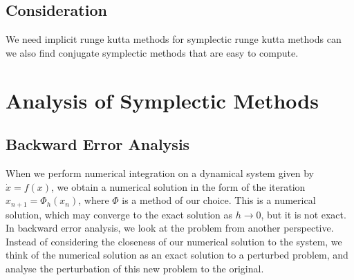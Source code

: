 \subsection{Consideration}

We need implicit runge kutta methods for symplectic runge kutta methods
can we also find conjugate symplectic methods that are easy to compute.


\section{Analysis of Symplectic Methods}

\subsection{Backward Error Analysis}

When we perform numerical integration on a dynamical system given by $\dot{x} = f(x)$,
we obtain a numerical solution in the form of the iteration $x_{n+1} = \Phi_h(x_n)$,
where $\Phi$ is a method of our choice.
This is a numerical solution, which may converge to the exact solution as $h \rightarrow 0$,
but it is not exact.
In backward error analysis, we look at the problem from another perspective.
Instead of considering the closeness of our numerical solution to the system,
we think of the numerical solution as an exact solution to a perturbed problem,
and analyse the perturbation of this new problem to the original.


